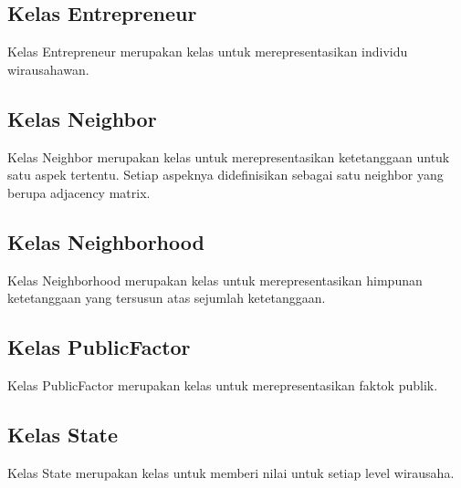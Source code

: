 \subsection{Kelas Entrepreneur} 
	Kelas Entrepreneur merupakan kelas untuk merepresentasikan individu wirausahawan.
\subsection{Kelas Neighbor}
	Kelas Neighbor merupakan kelas untuk merepresentasikan ketetanggaan untuk satu aspek tertentu. Setiap aspeknya didefinisikan sebagai satu neighbor yang berupa adjacency matrix.
\subsection{Kelas Neighborhood}
	Kelas Neighborhood merupakan kelas untuk merepresentasikan himpunan ketetanggaan yang tersusun atas sejumlah ketetanggaan.
\subsection{Kelas PublicFactor}
	Kelas PublicFactor merupakan kelas untuk merepresentasikan faktok publik.
\subsection{Kelas State}
	Kelas State merupakan kelas untuk memberi nilai untuk setiap level wirausaha.


